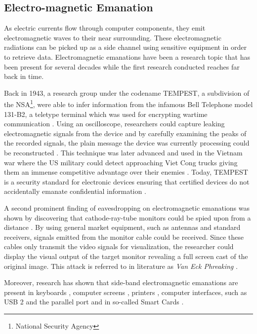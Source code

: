 \subsection{Electro-magnetic Emanation}
As electric currents flow through computer components, they emit electromagnetic waves to their near surrounding. These electromagnetic radiations can be picked up as a side channel using sensitive equipment in order to retrieve data. Electromagnetic emanations have been a research topic that has been present for several decades while the first research conducted reaches far back in time.

Back in 1943, a research group under the codename TEMPEST, a subdivision of the NSA\footnote{National Security Agency}, were able to infer information from the infamous Bell Telephone model 131-B2, a teletype terminal which was used for encrypting wartime communication \cite{tempest}. Using an oscilloscope, researchers could capture leaking electromagnetic signals from the device and by carefully examining the peaks of the recorded signals, the plain message the device was currently processing could be reconstructed \cite{tempest}. This technique was later advanced and used in the Vietnam war where the US military could detect approaching Viet Cong trucks giving them an immense competitive advantage over their enemies \cite{nalty2005war}. Today, TEMPEST is a security standard for electronic devices ensuring that certified devices do not accidentally emanate confidential information \cite{niaTempest}.

A second prominent finding of eavesdropping on electromagnetic emanations was shown by \citeauthor{vanEck:1985:ERV:7307.7308} discovering that cathode-ray-tube monitors could be spied upon from a distance \cite{vanEck:1985:ERV:7307.7308}. By using general market equipment, such as antennas and standard receivers, signals emitted from the monitor cable could be received. Since these cables only transmit the video signals for visualization, the researcher could display the visual output of the target monitor revealing a full screen cast of the original image. This attack is referred to in literature as \textit{Van Eck Phreaking} \cite{S&S,koch2012role}.

Moreover, research has shown that side-band electromagnetic emanations are present in keyboards \cite{Vuagnoux:2009:CEE:1855768.1855769}, computer screens \cite{vanEck:1985:ERV:7307.7308,kuhn2004electromagnetic}, printers \cite{przesmycki2014measurement}, computer interfaces, such as USB 2 \cite{nowosielski2014compromising} and the parallel port \cite{serialcablearticle} and in so-called Smart Cards \cite{Quisquater:2001:EAM:646803.705980}.

